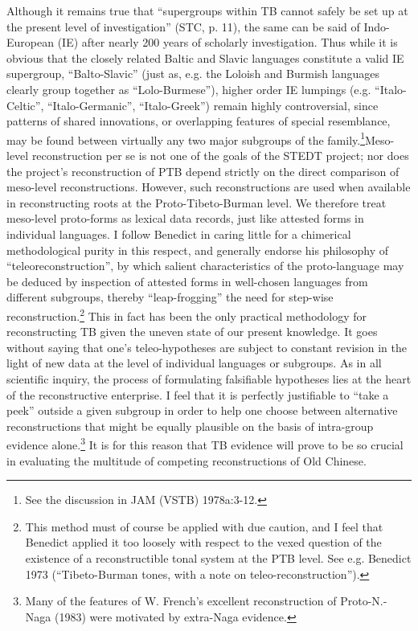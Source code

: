 \begin{itemize}
Although it remains true that ``supergroups within TB cannot safely be set up at the present level of investigation'' (STC, p. 11), the same can be said of Indo-European (IE) after nearly 200 years of scholarly investigation. Thus while it is obvious that the closely related Baltic and Slavic languages constitute a valid IE supergroup, ``Balto-Slavic'' (just as, e.g. the Loloish and Burmish languages clearly group together as ``Lolo-Burmese''), higher order IE lumpings (e.g. ``Italo-Celtic'', ``Italo-Germanic'', ``Italo-Greek'') remain highly controversial, since patterns of shared innovations, or overlapping features of special resemblance, may be found between virtually any two major subgroups of the family.\footnote{See the discussion in JAM (VSTB) 1978a:3-12.}Meso-level reconstruction per se is not one of the goals of the STEDT project; nor does the project's reconstruction of PTB depend strictly on the direct comparison of meso-level reconstructions. However, such reconstructions are used when available in reconstructing roots at the Proto-Tibeto-Burman level. We therefore treat meso-level proto-forms as lexical data records, just like attested forms in individual languages. I follow Benedict in caring little for a chimerical methodological purity in this respect, and generally endorse his philosophy of ``teleoreconstruction'', by which salient characteristics of the proto-language may be deduced by inspection of attested forms in well-chosen languages from different subgroups, thereby ``leap-frogging'' the need for step-wise reconstruction.\footnote{This method must of course be applied with due caution, and I feel that Benedict applied it too loosely with respect to the vexed question of the existence of a reconstructible tonal system at the PTB level. See e.g. Benedict 1973 (``Tibeto-Burman tones, with a note on teleo-reconstruction'').} This in fact has been the only practical methodology for reconstructing TB given the uneven state of our present knowledge. It goes without saying that one's teleo-hypotheses are subject to constant revision in the light of new data at the level of individual languages or subgroups. As in all scientific inquiry, the process of formulating falsifiable hypotheses lies at the heart of the reconstructive enterprise. I feel that it is perfectly justifiable to ``take a peek'' outside a given subgroup in order to help one choose between alternative reconstructions that might be equally plausible on the basis of intra-group evidence alone.\footnote{Many of the features of W. French's excellent reconstruction of Proto-N.-Naga (1983) were motivated by extra-Naga evidence.} It is for this reason that TB evidence will prove to be so crucial in evaluating the multitude of competing reconstructions of Old Chinese.


\end{itemize}
